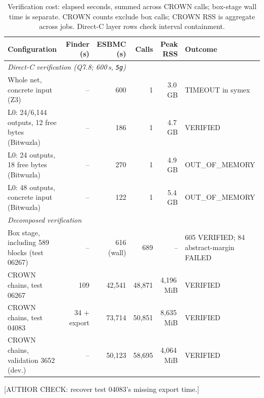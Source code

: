 \begin{table}[t]
\centering
\caption{Verification cost: elapsed seconds, summed across CROWN calls; box-stage wall time is separate. CROWN counts exclude box calls; CROWN RSS is aggregate across jobs. Direct-C layer rows check interval containment.}
\label{tab:cost}
\scriptsize
\renewcommand{\arraystretch}{1.15}
\setlength{\tabcolsep}{7pt}

\begin{tabular}{lrrrrl}
\toprule
\textbf{Configuration}
& \textbf{Finder (s)}
& \textbf{ESBMC (s)}
& \textbf{Calls}
& \textbf{Peak RSS}
& \textbf{Outcome} \\
\midrule

\multicolumn{6}{l}{\textit{Direct-C verification (Q7.8; 600\,s, \texttt{5g})}} \\
\addlinespace[1pt]

Whole net, concrete input (Z3)
& -- & 600 & 1 & 3.0\,GB
& TIMEOUT in symex \\

L0: 24/6,144 outputs, 12 free bytes (Bitwuzla)
& -- & 186 & 1 & 4.7\,GB
& VERIFIED \\

L0: 24 outputs, 18 free bytes (Bitwuzla)
& -- & 270 & 1 & 4.9\,GB
& OUT\_OF\_MEMORY \\

L0: 48 outputs, concrete input (Bitwuzla)
& -- & 122 & 1 & 5.4\,GB
& OUT\_OF\_MEMORY \\

\midrule

\multicolumn{6}{l}{\textit{Decomposed verification}} \\
\addlinespace[1pt]

Box stage, including 589 blocks (test 06267)
& -- & 616 (wall) & 689 & --
& 605 VERIFIED; 84 abstract-margin FAILED \\

CROWN chains, test 06267
& 109 & 42,541 & 48,871 & 4,196\,MiB
& VERIFIED \\

CROWN chains, test 04083
& 34 + export & 73,714 & 50,851 & 8,635\,MiB
& VERIFIED \\

CROWN chains, validation 3652 (dev.)
& -- & 50,123 & 58,695 & 4,064\,MiB
& VERIFIED \\

\bottomrule
\end{tabular}


\end{table}
[AUTHOR CHECK: recover test 04083's missing export time.]

